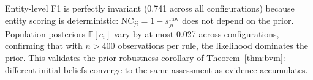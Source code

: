 Entity-level F1 is perfectly invariant (0.741 across all
configurations) because entity scoring is deterministic:
$\mathrm{NC}_{ji} = 1 - s_{ji}^{\mathrm{raw}}$ does not depend on
the prior. Population posteriors $\mathbb{E}[c_i]$ vary by at most
0.027 across configurations, confirming that with $n > 400$
observations per rule, the likelihood dominates the prior. This
validates the prior robustness corollary of Theorem~\ref{thm:bvm}:
different initial beliefs converge to the same assessment as evidence
accumulates.